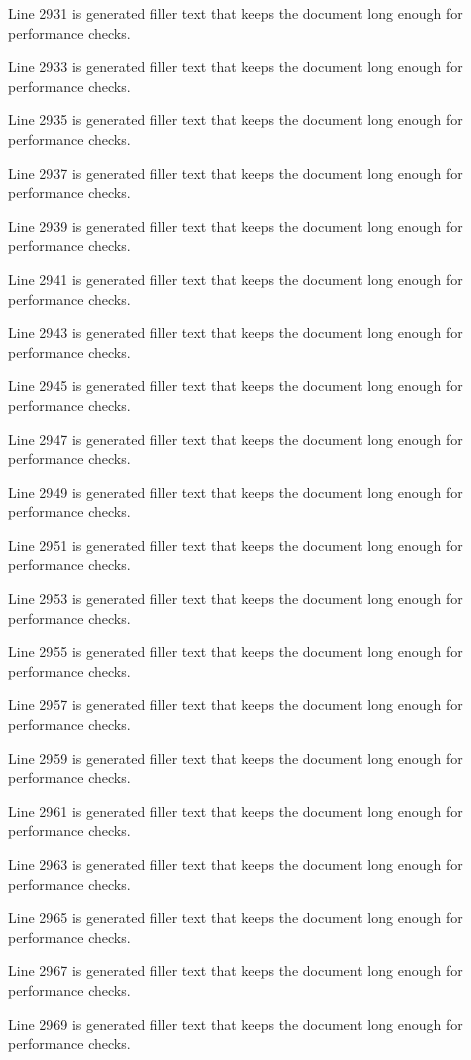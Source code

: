 Line 2931 is generated filler text that keeps the document long enough for performance checks.

Line 2933 is generated filler text that keeps the document long enough for performance checks.

Line 2935 is generated filler text that keeps the document long enough for performance checks.

Line 2937 is generated filler text that keeps the document long enough for performance checks.

Line 2939 is generated filler text that keeps the document long enough for performance checks.

Line 2941 is generated filler text that keeps the document long enough for performance checks.

Line 2943 is generated filler text that keeps the document long enough for performance checks.

Line 2945 is generated filler text that keeps the document long enough for performance checks.

Line 2947 is generated filler text that keeps the document long enough for performance checks.

Line 2949 is generated filler text that keeps the document long enough for performance checks.

Line 2951 is generated filler text that keeps the document long enough for performance checks.

Line 2953 is generated filler text that keeps the document long enough for performance checks.

Line 2955 is generated filler text that keeps the document long enough for performance checks.

Line 2957 is generated filler text that keeps the document long enough for performance checks.

Line 2959 is generated filler text that keeps the document long enough for performance checks.

Line 2961 is generated filler text that keeps the document long enough for performance checks.

Line 2963 is generated filler text that keeps the document long enough for performance checks.

Line 2965 is generated filler text that keeps the document long enough for performance checks.

Line 2967 is generated filler text that keeps the document long enough for performance checks.

Line 2969 is generated filler text that keeps the document long enough for performance checks.


